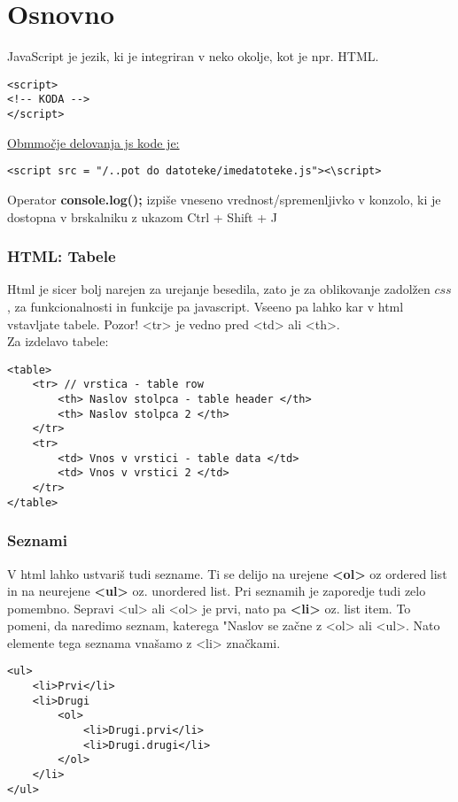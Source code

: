 \section{Osnovno}

JavaScript je jezik, ki je integriran v neko okolje, kot je npr. HTML.
\begin{verbatim}
<script>
<!-- KODA -->
</script>
\end{verbatim}

\underline{Obmmočje delovanja js kode je:} 
\begin{verbatim}
<script src = "/..pot do datoteke/imedatoteke.js"><\script>
\end{verbatim}

Operator \textbf{console.log();} izpiše vneseno vrednost/spremenljivko v konzolo, ki je dostopna v brskalniku z ukazom Ctrl + Shift + J

\subsubsection*{HTML: Tabele}

Html je sicer bolj narejen za urejanje besedila, zato je za oblikovanje zadolžen $css$, za funkcionalnosti in funkcije pa javascript. Vseeno pa lahko kar v html vstavljate tabele. Pozor! <tr> je vedno pred <td> ali <th>.\\
Za izdelavo tabele:

\begin{verbatim}
<table>
    <tr> // vrstica - table row
        <th> Naslov stolpca - table header </th>
        <th> Naslov stolpca 2 </th>
    </tr>
    <tr>
        <td> Vnos v vrstici - table data </td>
        <td> Vnos v vrstici 2 </td>
    </tr>
</table>
\end{verbatim}

\subsubsection*{Seznami}

V html lahko ustvariš tudi sezname. Ti se delijo na urejene \textbf{<ol>} oz ordered list in na neurejene \textbf{<ul>} oz. unordered list. Pri seznamih je zaporedje tudi zelo pomembno. Sepravi <ul> ali <ol> je prvi, nato pa \textbf{<li>} oz. list item. To pomeni, da naredimo seznam, katerega "Naslov se začne z <ol> ali <ul>. Nato elemente tega seznama vnašamo z <li> značkami.
\pagebreak
\begin{verbatim}
<ul>
    <li>Prvi</li>
    <li>Drugi
        <ol>
            <li>Drugi.prvi</li>
            <li>Drugi.drugi</li>
        </ol>    
    </li>
</ul>
\end{verbatim}

